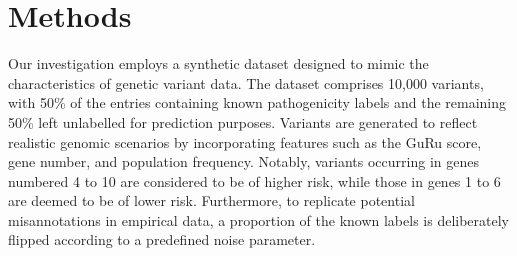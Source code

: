 %
%

\section{Methods}
Our investigation employs a synthetic dataset designed to mimic the characteristics of genetic variant data. The dataset comprises 10,000 variants, with 50\% of the entries containing known pathogenicity labels and the remaining 50\% left unlabelled for prediction purposes. Variants are generated to reflect realistic genomic scenarios by incorporating features such as the GuRu score, gene number, and population frequency. Notably, variants occurring in genes numbered 4 to 10 are considered to be of higher risk, while those in genes 1 to 6 are deemed to be of lower risk. Furthermore, to replicate potential misannotations in empirical data, a proportion of the known labels is deliberately flipped according to a predefined noise parameter.


